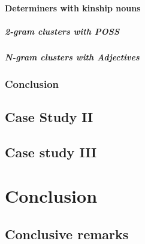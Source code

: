 \documentclass[
  a4paper,
  twoside,
  12pt,
  chapterprefix=false,
  bibliography=totocnumbered,
  listof=flat]{scrbook}
\begin{document}
\hypertarget{determiners-with-kinship-nouns}{%
\subsection{Determiners with kinship nouns}\label{determiners-with-kinship-nouns}}

\hypertarget{gram-clusters-with-poss}{%
\subsubsection{2-gram clusters with POSS}\label{gram-clusters-with-poss}}

\hypertarget{n-gram-clusters-with-adjectives}{%
\subsubsection{N-gram clusters with Adjectives}\label{n-gram-clusters-with-adjectives}}

\hypertarget{conclusion}{%
\section{Conclusion}\label{conclusion}}

\hypertarget{case-study-ii}{%
\chapter{Case Study II}\label{case-study-ii}}

\hypertarget{case-study-iii}{%
\chapter{Case study III}\label{case-study-iii}}

\part{Conclusion}

\hypertarget{conclusive-remarks}{%
\chapter{Conclusive remarks}\label{conclusive-remarks}}

  
\end{document}
